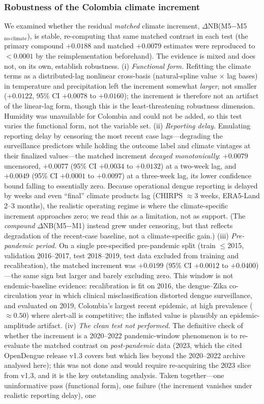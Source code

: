 \documentclass[11pt,a4paper]{article}
\begin{document}
\subsubsection*{Robustness of the Colombia climate increment}
We examined whether the residual \emph{matched} climate increment, $\Delta$NB(M5$-$M5$_{\text{no-climate}}$), is stable, re-computing that same matched contrast in each test (the primary compound $+0.0188$ and matched $+0.0079$ estimates were reproduced to $<0.0001$ by the reimplementation beforehand). The evidence is mixed and does not, on its own, establish robustness. (i) \emph{Functional form.} Refitting the climate terms as a distributed-lag nonlinear cross-basis (natural-spline value $\times$ lag bases) in temperature and precipitation left the increment somewhat \emph{larger}, not smaller ($+0.0122$, 95\% CI $+0.0078$ to $+0.0160$); the increment is therefore not an artifact of the linear-lag form, though this is the least-threatening robustness dimension. Humidity was unavailable for Colombia and could not be added, so this test varies the functional form, not the variable set. (ii) \emph{Reporting delay.} Emulating reporting delay by censoring the most recent case lags---degrading the surveillance predictors while holding the outcome label and climate vintages at their finalized values---the matched increment \emph{decayed monotonically}: $+0.0079$ uncensored, $+0.0077$ (95\% CI $+0.0034$ to $+0.0132$) at a two-week lag, and $+0.0049$ (95\% CI $+0.0001$ to $+0.0097$) at a three-week lag, its lower confidence bound falling to essentially zero. Because operational dengue reporting is delayed by weeks and even ``final'' climate products lag (CHIRPS $\approx$3 weeks, ERA5-Land 2--3 months), the realistic operating regime is where the climate-specific increment approaches zero; we read this as a limitation, not as support. (The \emph{compound} $\Delta$NB(M5$-$M1) instead grew under censoring, but that reflects degradation of the recent-case baseline, not a climate-specific gain.) (iii) \emph{Pre-pandemic period.} On a single pre-specified pre-pandemic split (train $\le$2015, validation 2016--2017, test 2018--2019, test data excluded from training and recalibration), the matched increment was $+0.0199$ (95\% CI $+0.0012$ to $+0.0400$)---the same sign but larger and barely excluding zero. This window is not endemic-baseline evidence: recalibration is fit on 2016, the dengue--Zika co-circulation year in which clinical misclassification distorted dengue surveillance, and evaluated on 2019, Colombia's largest recent epidemic, at high prevalence ($\approx0.50$) where alert-all is competitive; the inflated value is plausibly an epidemic-amplitude artifact. (iv) \emph{The clean test not performed.} The definitive check of whether the increment is a 2020--2022 pandemic-window phenomenon is to re-evaluate the matched contrast on \emph{post-pandemic} data (2023, which the cited OpenDengue release v1.3 covers but which lies beyond the 2020--2022 archive analysed here); this was not done and would require re-acquiring the 2023 slice from v1.3, and it is the key outstanding analysis. Taken together---one uninformative pass (functional form), one failure (the increment vanishes under realistic reporting delay), one 
\end{document}
